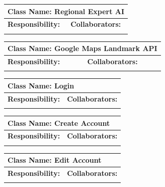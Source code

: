 \documentclass[]{article}
\begin{document}
\begin{itemize}
	\begin{table}
		\centering
		\begin{tabular}{|p{5cm}|p{5cm}|}
		\hline 
		 \multicolumn{2}{|l|}{\textbf{Class Name:} Regional Expert AI} \\
		\hline
		\textbf{Responsibility:} & \textbf{Collaborators:} \\
		\hline
		\vspace{1in} & \\
		\hline
		\end{tabular}
	\end{table}

	\begin{table}
		\centering
		\begin{tabular}{|p{5cm}|p{5cm}|}
		\hline 
		 \multicolumn{2}{|l|}{\textbf{Class Name:} Google Maps Landmark API} \\
		\hline
		\textbf{Responsibility:} & \textbf{Collaborators:} \\
		\hline
		\vspace{1in} & \\
		\hline
		\end{tabular}
	\end{table}

	\begin{table}
		\centering
		\begin{tabular}{|p{5cm}|p{5cm}|}
		\hline 
		 \multicolumn{2}{|l|}{\textbf{Class Name:} Login} \\
		\hline
		\textbf{Responsibility:} & \textbf{Collaborators:} \\
		\hline
		\vspace{1in} & \\
		\hline
		\end{tabular}
	\end{table}

	\begin{table}
		\centering
		\begin{tabular}{|p{5cm}|p{5cm}|}
		\hline 
		 \multicolumn{2}{|l|}{\textbf{Class Name:} Create Account} \\
		\hline
		\textbf{Responsibility:} & \textbf{Collaborators:} \\
		\hline
		\vspace{1in} & \\
		\hline
		\end{tabular}
	\end{table}

	\begin{table}
		\centering
		\begin{tabular}{|p{5cm}|p{5cm}|}
		\hline 
		 \multicolumn{2}{|l|}{\textbf{Class Name:} Edit Account} \\
		\hline
		\textbf{Responsibility:} & \textbf{Collaborators:} \\
		\hline
		\vspace{1in} & \\
		\hline
		\end{tabular}
	\end{table}


\end{itemize}
\end{document}
